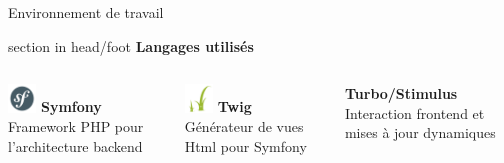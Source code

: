 \documentclass{beamer}
\begin{document}
\begin{frame}{Environnement de travail}
	\begin{beamercolorbox}[wd=\paperwidth,ht=1.5em,dp=0.5em,leftskip=0.5cm]{section in head/foot}
  		\large \textbf{Langages utilisés}
	\end{beamercolorbox}
	\vspace{0.5em}
	\begin{center}
		\begin{minipage}{0.9\textwidth}
  			\begin{columns}[T, onlytextwidth]
    
    					\vspace{2.5em}
      				\begin{minipage}[t][2cm][t]{\linewidth}
        					\raggedright
        					\includegraphics[height=0.75cm]{../img/logo_symfony.png}
        					\hspace{0.6cm} \textbf{Symfony} \\
        					Framework PHP pour l'architecture backend
      				\end{minipage}
      				\vspace{0.7em}
          			\pause
      
      				\begin{minipage}[t][2cm][t]{\linewidth}
        					\raggedright
        					\includegraphics[height=0.75cm]{../img/logo_twig.png}
        					\hspace{0.6cm} \textbf{Twig} \\
        					Générateur de vues Html pour Symfony
      				\end{minipage}
          			\pause

    
      				\begin{minipage}[t][2cm][t]{\linewidth}
        					\raggedright
        					\textbf{Turbo/Stimulus} \\
        					Interaction frontend et mises à jour dynamiques
      				\end{minipage}
      				\vspace{0.7em}
          			\pause
      

\end{columns}
\end{minipage}
\end{center}
\end{frame}
\end{document}

